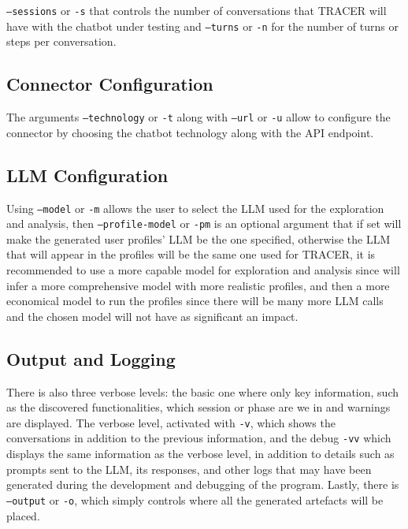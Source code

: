 \texttt{--sessions} or \texttt{-s} that controls the number of conversations
that \ac{TRACER} will have with the chatbot under testing
and \texttt{--turns} or \texttt{-n} for the number of turns or steps per conversation.

\subsection{Connector Configuration}

The arguments \texttt{--technology} or \texttt{-t} along with \texttt{--url} or \texttt{-u}
allow to configure the connector by choosing
the chatbot technology along with the \ac{API} endpoint.

\subsection{LLM Configuration}

Using \texttt{--model} or \texttt{-m} allows the user to select the \acl{LLM}
used for the exploration and analysis,
then \texttt{--profile-model} or \texttt{-pm} is an optional argument
that if set will make the generated user profiles' \ac{LLM} be the one specified,
otherwise the \ac{LLM} that will appear in the profiles
will be the same one used for \ac{TRACER},
it is recommended to use a more capable model for exploration and analysis
since will infer a more comprehensive model with more realistic profiles,
and then a more economical model to run the profiles
since there will be many more \ac{LLM} calls
and the chosen model will not have as significant an impact.

\subsection{Output and Logging}

There is also three verbose levels:
the basic one where only key information, such as the discovered functionalities,
which session or phase are we in and warnings are displayed.
The verbose level, activated with \texttt{-v},
which shows the conversations in addition to the previous information,
and the debug \texttt{-vv}
which displays the same information as the verbose level,
in addition to details such as prompts
sent to the \ac{LLM}, its responses,
and other logs that may have been generated
during the development and debugging of the program.
Lastly, there is \texttt{--output} or \texttt{-o},
which simply controls where all the generated artefacts will be placed.

